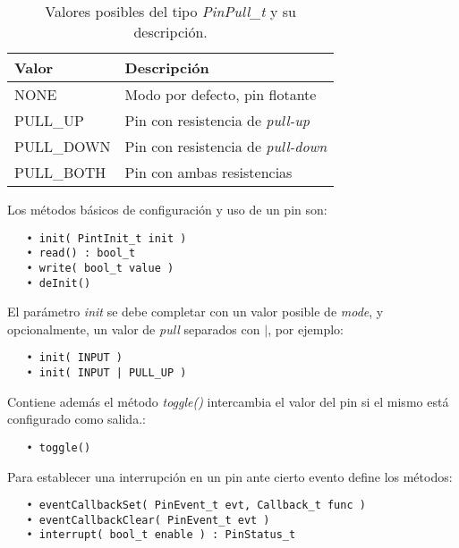 \begin{table}[h]
	\centering	
	\begin{tabular}{l l}   
		\toprule
		\textbf{Valor} 	    & \textbf{Descripción} \\
		\midrule
		NONE	       & Modo por defecto, pin flotante \\		
		PULL\_UP	    & Pin con resistencia de \emph{pull-up} \\
		PULL\_DOWN	 & Pin con resistencia de \emph{pull-down} \\
		PULL\_BOTH	 & Pin con ambas resistencias \\
		\bottomrule
		\hline
	\end{tabular}
	\caption[Valores posibles del tipo \emph{PinPull\_t}.]{Valores posibles del tipo \emph{PinPull\_t} y su descripción.}
	\label{tab:PullT}
\end{table}



Los métodos básicos de configuración y uso de un pin son:

\begin{verbatim}
   • init( PintInit_t init )
   • read() : bool_t
   • write( bool_t value )
   • deInit()
\end{verbatim}


El parámetro \emph{init} se debe completar con un valor posible de \emph{mode}, y opcionalmente, un valor de \emph{pull} separados con $|$, por ejemplo:

\begin{verbatim}
   • init( INPUT )
   • init( INPUT | PULL_UP )
\end{verbatim}

Contiene además el método \emph{toggle()} intercambia el valor del pin si el mismo está configurado como salida.:

\begin{verbatim}
   • toggle()
\end{verbatim}

Para establecer una interrupción en un pin ante cierto evento define los métodos: 

\begin{verbatim}
   • eventCallbackSet( PinEvent_t evt, Callback_t func )
   • eventCallbackClear( PinEvent_t evt )
   • interrupt( bool_t enable ) : PinStatus_t
 \end{verbatim} 

